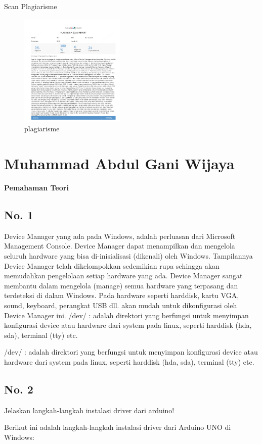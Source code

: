 \par Scan Plagiarisme
\begin{figure}[ht!]
\includegraphics[width=5cm]{figures/5/1174080/Teori/plagiarismteori5.png}
\centering
\caption{plagiarisme}
\end{figure}
\section{Muhammad Abdul Gani Wijaya}
{\Large \textbf{Pemahaman Teori}}
\subsection{No. 1}
Device Manager yang ada pada Windows, adalah perluasan dari Microsoft Management Console. Device Manager dapat menampilkan dan mengelola seluruh hardware yang bisa di-inisialisasi (dikenali) oleh Windows. Tampilannya Device Manager telah dikelompokkan sedemikian rupa sehingga akan memudahkan pengelolaan setiap hardware yang ada. Device Manager sangat membantu dalam mengelola (manage) semua hardware yang terpasang dan terdeteksi di dalam Windows. Pada hardware seperti harddisk, kartu VGA, sound, keyboard, perangkat USB dll. akan mudah untuk dikonfigurasi oleh Device Manager ini.
/dev/ : adalah direktori yang berfungsi untuk menyimpan konfigurasi device atau hardware dari system pada linux, seperti harddisk (hda, sda), terminal (tty) etc.

/dev/ : adalah direktori yang berfungsi untuk menyimpan konfigurasi device atau hardware dari system pada linux, seperti harddisk (hda, sda), terminal (tty) etc.

\subsection{No. 2}
Jelaskan langkah-langkah instalasi driver dari arduino!

\hfill \break
Berikut ini adalah langkah-langkah instalasi driver dari Arduino UNO di Windows:

